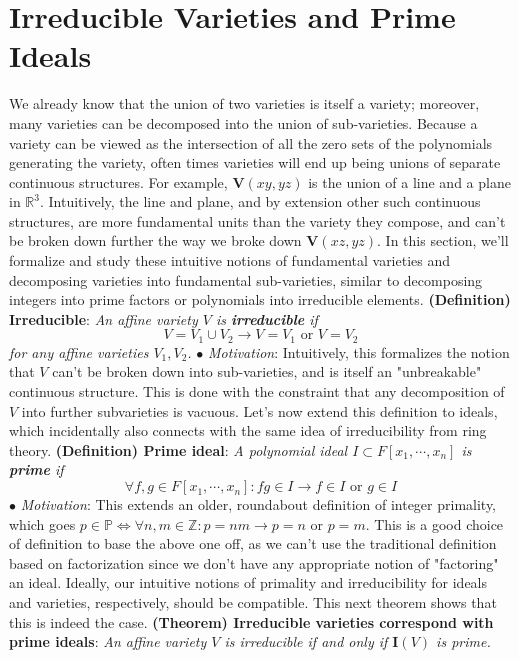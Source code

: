 \documentclass{article}
\newcommand*{\tb}{\textbf}
\newcommand*{\ti}{\textit}
\newcommand*{\n}{\newline}
\newcommand*{\nn}{\newline \newline}
\newcommand*{\Fx}{\ensuremath{F[x_1, \cdots, x_n]}}
\newcommand*{\V}{\ensuremath{\mathbf{V}}}
\newcommand*{\I}{\ensuremath{\mathbf{I}}}
\begin{document}
\section{Irreducible Varieties and Prime Ideals}
We already know that the union of two varieties is itself a variety; moreover, many varieties can be decomposed into the union of sub-varieties. Because a variety can be viewed as the intersection of all the zero sets of the polynomials generating the variety, often times varieties will end up being unions of separate continuous structures. For example, $ \V(xy, yz) $ is the union of a line and a plane in $ \mathbb{R}^3 $. Intuitively, the line and plane, and by extension other such continuous structures, are more fundamental units than the variety they compose, and can't be broken down further the way we broke down $ \V(xz, yz) $. In this section, we'll formalize and study these intuitive notions of fundamental varieties and decomposing varieties into fundamental sub-varieties, similar to decomposing integers into prime factors or polynomials into irreducible elements.
\nn
\tb{(Definition) Irreducible}: \ti{An affine variety $ V $ is \tb{irreducible} if}
$$ V = V_1 \cup V_2 \rightarrow V = V_1 \text{ or } V = V_2 $$
\indent \ti{for any affine varieties $ V_1, V_2 $.}
\n
\indent $ \bullet $ \ti{Motivation}: Intuitively, this formalizes the notion that $ V $ can't be broken down into sub-varieties, and is itself an "unbreakable" continuous structure. This is done with the constraint that any decomposition of $ V $ into further subvarieties is vacuous.
\nn
Let's now extend this definition to ideals, which incidentally also connects with the same idea of irreducibility from ring theory.
\nn
\tb{(Definition) Prime ideal}: \ti{A polynomial ideal $ I \subset \Fx $ is \tb{prime} if}
$$ \forall f, g \in \Fx: f g \in I \rightarrow f \in I \text{ or } g \in I $$
\indent $ \bullet $ \ti{Motivation}: This extends an older, roundabout definition of integer primality, which goes $ p \in \mathbb{P} \iff \forall n, m \in \mathbb{Z}: p = n m \rightarrow p = n \text{ or } p = m $. This is a good choice of definition to base the above one off, as we can't use the traditional definition based on factorization since we don't have any appropriate notion of "factoring" an ideal.
\nn
Ideally, our intuitive notions of primality and irreducibility for ideals and varieties, respectively, should be compatible. This next theorem shows that this is indeed the case.
\nn
\tb{(Theorem) Irreducible varieties correspond with prime ideals}: \ti{An affine variety $ V $ is irreducible if and only if $ \I(V) $ is prime.}
\end{document}
